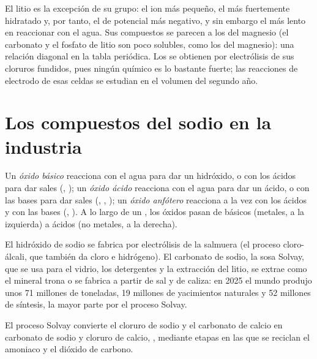 El litio es la excepción de su grupo: el ion más pequeño, el más
fuertemente hidratado y, por tanto, el de potencial más negativo, y sin
embargo el más lento en reaccionar con el agua. Sus compuestos se parecen
a los del magnesio (el carbonato y el fosfato de litio son poco solubles,
como los del magnesio): una relación diagonal en la tabla periódica. Los
 se obtienen por electrólisis de sus cloruros fundidos,
pues ningún  químico es lo bastante fuerte; las reacciones de
electrodo de esas celdas se estudian en el volumen del segundo año.

\section{Los compuestos del sodio en la industria}

\begin{definition}\label{def:b1:s-block:oxide-character}
Un \emph{óxido básico} reacciona con el agua para dar un
hidróxido, o con los ácidos para dar sales (, ); un
\emph{óxido ácido} reacciona con el agua para dar un ácido, o
con las bases para dar sales (, , ); un
\emph{óxido anfótero} reacciona a la vez con los ácidos y
con las bases (, ). A lo largo de un , los
óxidos pasan de básicos (metales, a la izquierda) a ácidos (no metales, a
la derecha).
\end{definition}

El hidróxido de sodio se fabrica por electrólisis de la salmuera (el
proceso cloro-álcali, que también da cloro e hidrógeno). El carbonato de
sodio, la sosa Solvay, que se usa para el vidrio, los detergentes y la
extracción del litio, se extrae como el mineral trona o se fabrica a
partir de sal y de caliza: en 2025 el mundo produjo unos 71 millones de
toneladas, 19 millones de yacimientos naturales y 52 millones de síntesis,
la mayor parte por el proceso Solvay.

\begin{proposition}\label{prop:b1:s-block:solvay}
El proceso Solvay convierte el cloruro de sodio y el carbonato de calcio
en carbonato de sodio y cloruro de calcio, , mediante etapas en las que se reciclan el amoniaco y el dióxido
de carbono.
\end{proposition}

